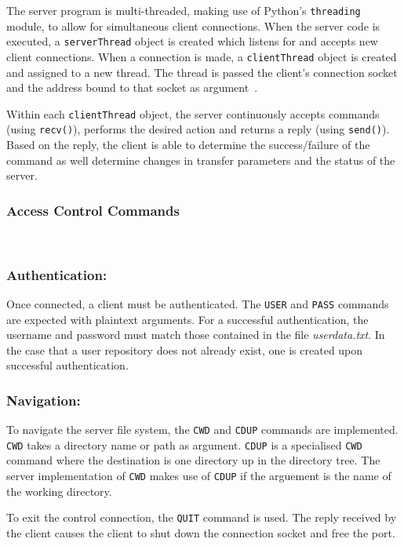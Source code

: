 \documentclass[10pt,twocolumn]{witseiepaper}
\begin{document}
 The server program is multi-threaded, making use of Python's \texttt{threading} module, to allow for simultaneous client connections. When the server code is executed, a \texttt{serverThread} object is created which listens for and accepts new client connections. When a connection is made, a \texttt{clientThread} object is created and assigned to a new thread. The thread is passed the client's connection socket and the address bound to that socket as argument~\cite{socketModule}.
 
 Within each \texttt{clientThread} object, the server continuously accepts commands (using \texttt{recv()}), performs the desired action and returns a reply (using \texttt{send()}). Based on the reply, the client is able to determine the success/failure of the command as well determine changes in transfer parameters and the status of the server.
 
\vspace*{-2mm}
\subsubsection{Access Control Commands} $   $

\subsubsection*{Authentication:} \vspace*{-\baselineskip}
Once connected, a client must be authenticated. The \texttt{USER} and \texttt{PASS} commands are expected with plaintext arguments. For a successful authentication, the username and password must match those contained in the file \textit{userdata.txt}. In the case that a user repository does not already exist, one is created upon successful authentication.

\vspace*{-2mm}
\subsubsection*{Navigation:}
To navigate the server file system, the \texttt{CWD} and \texttt{CDUP} commands are implemented. \texttt{CWD} takes a directory name or path as argument. \texttt{CDUP} is a specialised \texttt{CWD} command where the destination is one directory up in the directory tree. The server implementation of \texttt{CWD} makes use of \texttt{CDUP} if the arguement is the name of the working directory.

To exit the control connection, the \texttt{QUIT} command is used. The reply received by the client causes the client to shut down the connection socket and free the port. 
\end{document}
